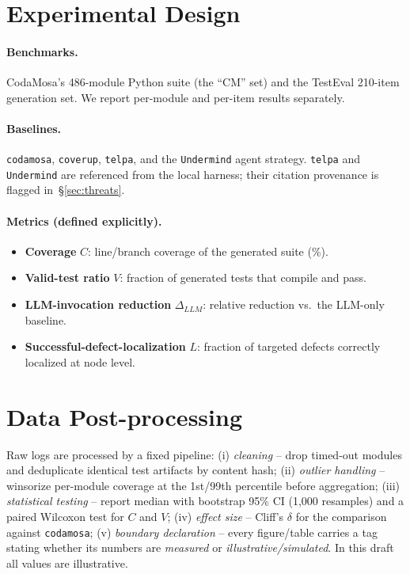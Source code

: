 \documentclass[11pt]{article}
\begin{document}
\section{Experimental Design}
\paragraph{Benchmarks.} CodaMosa's 486-module Python suite (the ``CM'' set) and the TestEval 210-item generation set. We report per-module and per-item results separately.
\paragraph{Baselines.} \texttt{codamosa}, \texttt{coverup}, \texttt{telpa}, and the \texttt{Undermind} agent strategy. \texttt{telpa} and \texttt{Undermind} are referenced from the local harness; their citation provenance is flagged in~\S\ref{sec:threats}.
\paragraph{Metrics (defined explicitly).}
\begin{itemize}
  \item \textbf{Coverage} $C$: line/branch coverage of the generated suite (\%).
  \item \textbf{Valid-test ratio} $V$: fraction of generated tests that compile and pass.
  \item \textbf{LLM-invocation reduction} $\Delta_{LLM}$: relative reduction vs.\ the LLM-only baseline.
  \item \textbf{Successful-defect-localization} $L$: fraction of targeted defects correctly localized at node level.
\end{itemize}

\section{Data Post-processing}
\label{sec:post}
Raw logs are processed by a fixed pipeline: (i) \emph{cleaning} -- drop timed-out modules and deduplicate identical test artifacts by content hash; (ii) \emph{outlier handling} -- winsorize per-module coverage at the 1st/99th percentile before aggregation; (iii) \emph{statistical testing} -- report median with bootstrap 95\% CI (1,000 resamples) and a paired Wilcoxon test for $C$ and $V$; (iv) \emph{effect size} -- Cliff's $\delta$ for the comparison against \texttt{codamosa}; (v) \emph{boundary declaration} -- every figure/table carries a tag stating whether its numbers are \emph{measured} or \emph{illustrative/simulated}. \textcolor{warn}{In this draft all values are illustrative.}
\end{document}
